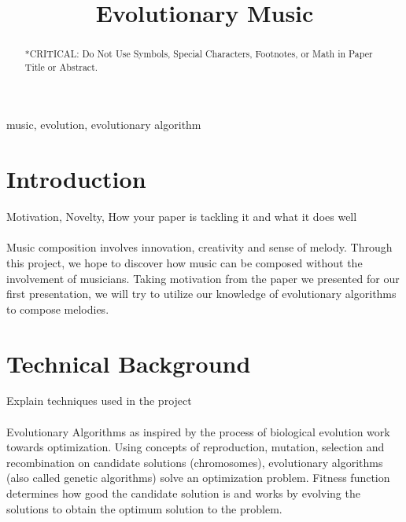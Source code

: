 \documentclass[conference]{IEEEtran}
\begin{document}
\title{Evolutionary Music%
}

\author{
\and
{}
}

\maketitle

\begin{abstract}
*CRITICAL: Do Not Use Symbols, Special Characters, Footnotes, 
or Math in Paper Title or Abstract.
\end{abstract}

\begin{IEEEkeywords}
music, evolution, evolutionary algorithm
\end{IEEEkeywords}

\section{Introduction}
Motivation, Novelty, How your paper is tackling it and what it does well\\
\\
Music composition involves innovation, creativity and sense of melody. Through this project, we hope to discover how music can be composed without the involvement of musicians. Taking motivation from the paper we presented for our first presentation, we will try to utilize our knowledge of evolutionary algorithms to compose melodies.


\section{Technical Background}
Explain techniques used in the project\\\\
Evolutionary Algorithms as inspired by the process of biological evolution work towards optimization. Using concepts of reproduction, mutation, selection and recombination on candidate solutions (chromosomes), evolutionary algorithms (also called genetic algorithms) solve an optimization problem. Fitness function determines how good the candidate solution is and works by evolving the solutions to obtain the optimum solution to the problem.
\end{document}
